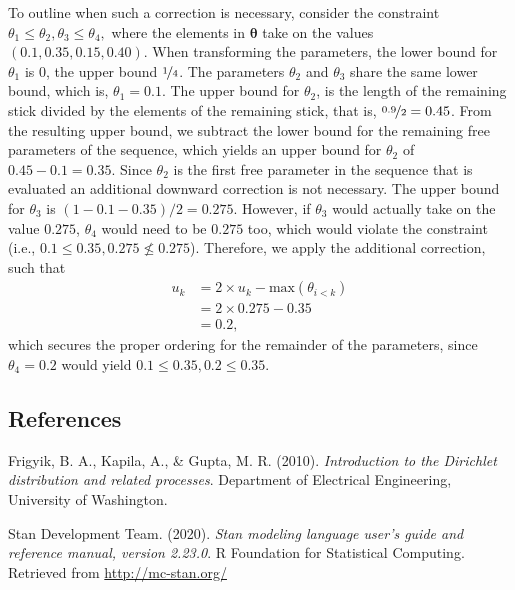 \documentclass[
  english,
  man,floatsintext]{apa6}
\newlength{\cslhangindent}
\newenvironment{cslreferences}%
  {\setlength{\parindent}{0pt}%
  \everypar{\setlength{\hangindent}{\cslhangindent}}\ignorespaces}%
  {\par}
\begin{document}
\begin{appendix}
To outline when such a correction is necessary, consider the constraint
\(\theta_1 \leq \theta_2, \theta_3 \leq \theta_4,\) where the elements
in \(\boldsymbol{\theta}\) take on the values
\((0.1, 0.35, 0.15, 0.40)\). When transforming the parameters, the lower
bound for \(\theta_1\) is \(0\), the upper bound \(\nicefrac{1}{4}\).
The parameters \(\theta_2\) and \(\theta_3\) share the same lower bound,
which is, \(\theta_1 = 0.1\). The upper bound for \(\theta_2\), is the
length of the remaining stick divided by the elements of the remaining
stick, that is, \(\nicefrac{0.9}{2} = 0.45\). From the resulting upper
bound, we subtract the lower bound for the remaining free parameters of
the sequence, which yields an upper bound for \(\theta_2\) of
\(0.45 - 0.1 = 0.35\). Since \(\theta_2\) is the first free parameter in
the sequence that is evaluated an additional downward correction is not
necessary. The upper bound for \(\theta_3\) is
\((1 - 0.1 - 0.35)/2 = 0.275\). However, if \(\theta_3\) would actually
take on the value \(0.275\), \(\theta_4\) would need to be \(0.275\)
too, which would violate the constraint (i.e.,
\(0.1 \leq 0.35, 0.275 \nleq 0.275\)). Therefore, we apply the
additional correction, such that \begin{align}
u_k &= 2 \times u_k - \text{max}(\theta_{i < k}) \\
&= 2 \times 0.275 - 0.35 \\
&= 0.2,
\end{align} which secures the proper ordering for the remainder of the
parameters, since \(\theta_4 = 0.2\) would yield
\(0.1 \leq 0.35, 0.2 \leq 0.35\).

\hypertarget{references}{%
\subsection{References}\label{references}}

\begingroup
\setlength{\parindent}{-0.5in}
\setlength{\leftskip}{0.5in}

\hypertarget{refs}{}
\begin{cslreferences}
\leavevmode\hypertarget{ref-frigyik2010introduction}{}%
Frigyik, B. A., Kapila, A., \& Gupta, M. R. (2010). \emph{Introduction
to the Dirichlet distribution and related processes}. Department of
Electrical Engineering, University of Washington.

\leavevmode\hypertarget{ref-stan2020}{}%
Stan Development Team. (2020). \emph{Stan modeling language user's guide
and reference manual, version 2.23.0}. R Foundation for Statistical
Computing. Retrieved from \url{http://mc-stan.org/}
\end{cslreferences}

\endgroup
\end{appendix}
\end{document}
